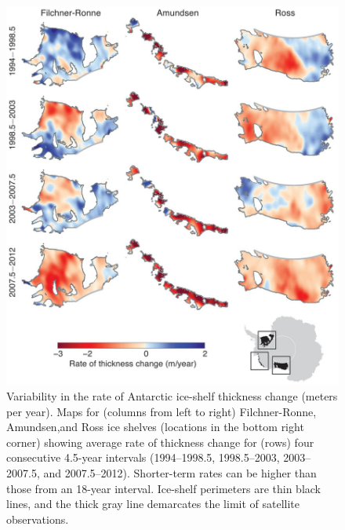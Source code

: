 \begin{figure}[!h]
  \centering
  \vspace{1.2cm}
  \includegraphics[width=.95\textwidth]{img/Fig2_pannels_review_final.jpg}
  \vspace{.8cm}
  \caption[Variability in the rate of Antarctic ice-shelf thickness]{
  \ssp \footnotesize
  Variability in the rate of Antarctic ice-shelf thickness change
  (meters per year). Maps for (columns from left to right) Filchner-Ronne,
  Amundsen,and Ross ice shelves (locations in the bottom right corner) showing
  average rate of thickness change for (rows) four consecutive 4.5-year
  intervals (1994--1998.5, 1998.5--2003, 2003--2007.5, and 2007.5--2012).
  Shorter-term rates can be higher than those from an 18-year interval.
  Ice-shelf perimeters are thin black lines, and the thick gray line demarcates
  the limit of satellite observations.}
  \label{fig:ice-shelf-var}
\end{figure}
\clearpage


